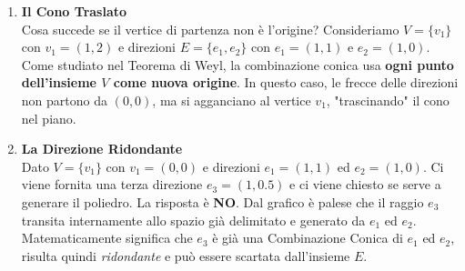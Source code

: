\documentclass[12pt, a4paper]{article}
\begin{document}
\begin{enumerate}[label=\textbf{Esercizio \arabic*:}, itemsep=15pt, parsep=5pt, leftmargin=*]
		\item \textbf{Il Cono Traslato}\\
		Cosa succede se il vertice di partenza non è l'origine? Consideriamo $V = \{v_1\}$ con $v_1=(1,2)$ e direzioni $E = \{e_1, e_2\}$ con $e_1=(1,1)$ e $e_2=(1,0)$. 
		Come studiato nel Teorema di Weyl, la combinazione conica usa \textbf{ogni punto dell'insieme $V$ come nuova origine}. In questo caso, le frecce delle direzioni non partono da $(0,0)$, ma si agganciano al vertice $v_1$, "trascinando" il cono nel piano.
		
		\begin{figure}[H]
			\centering
		\end{figure}
		
		\item \textbf{La Direzione Ridondante}\\
		Dato $V=\{v_1\}$ con $v_1=(0,0)$ e direzioni $e_1=(1,1)$ ed $e_2=(1,0)$. Ci viene fornita una terza direzione $e_3=(1,0.5)$ e ci viene chiesto se serve a generare il poliedro. 
		La risposta è \textbf{NO}. Dal grafico è palese che il raggio $e_3$ transita internamente allo spazio già delimitato e generato da $e_1$ ed $e_2$. Matematicamente significa che $e_3$ è già una Combinazione Conica di $e_1$ ed $e_2$, risulta quindi \textit{ridondante} e può essere scartata dall'insieme $E$.
		
		\begin{figure}[H]
			\centering
\end{figure}
\end{enumerate}
\end{document}
